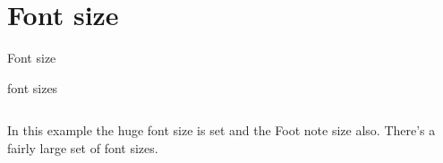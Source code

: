 \section{Font size}


\begin{frame}{Font size}

    \begin{esempio}{font sizes}
           \inputminted[linenos] {latex}{res/examples/font_size.tex}
    \end{esempio}
    
    \vspace{1cm}
    
    In this example the {\huge huge font size} is set and 
    the {\footnotesize Foot note size also}.
    There's a fairly large set of font sizes.

\end{frame}